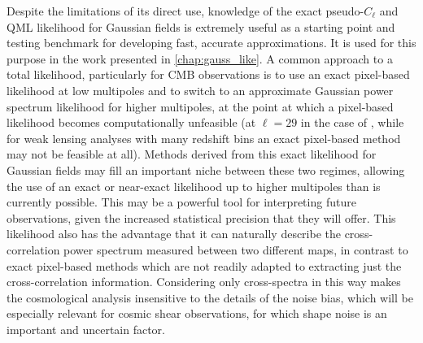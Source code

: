 Despite the limitations of its direct use, knowledge of the exact pseudo-$C_\ell$ and QML likelihood for Gaussian fields is extremely useful as a starting point and testing benchmark for developing fast, accurate approximations. It is used for this purpose in the work presented in \autoref{chap:gauss_like}. A common approach to a total likelihood, particularly for CMB observations \citep[e.g.][]{Planck2018V} is to use an exact pixel-based likelihood at low multipoles and to switch to an approximate Gaussian power spectrum likelihood for higher multipoles, at the point at which a pixel-based likelihood becomes computationally unfeasible (at $\ell = 29$ in the case of \Planck{}, while for weak lensing analyses with many redshift bins an exact pixel-based method may not be feasible at all). Methods derived from this exact likelihood for Gaussian fields may fill an important niche between these two regimes, allowing the use of an exact or near-exact likelihood up to higher multipoles than is currently possible. This may be a powerful tool for interpreting future observations, given the increased statistical precision that they will offer. This likelihood also has the advantage that it can naturally describe the cross-correlation power spectrum measured between two different maps, in contrast to exact pixel-based methods which are not readily adapted to extracting just the cross-correlation information. Considering only cross-spectra in this way makes the cosmological analysis insensitive to the details of the noise bias, which will be especially relevant for cosmic shear observations, for which shape noise is an important and uncertain factor.


% 
